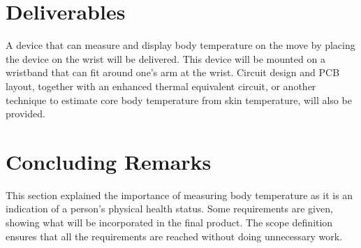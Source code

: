 \section{Deliverables}
A device that can measure and display body temperature on the move by placing the device on the wrist will be delivered. This device will be mounted on a wristband that can fit around one's arm at the wrist. Circuit design and PCB layout, together with an enhanced thermal equivalent circuit, or another technique to estimate core body temperature from skin temperature, will also be provided. 

\section{Concluding Remarks}
This section explained the importance of measuring body temperature as it is an indication of a person's physical health status. Some requirements are given, showing what will be incorporated in the final product. The scope definition ensures that all the requirements are reached without doing unnecessary work. 